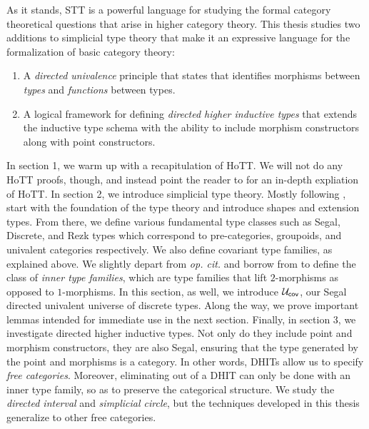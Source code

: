 \documentclass[main.tex]{subfiles}
\begin{document}
As it stands, STT is a powerful language for studying the formal category theoretical questions that arise in higher category theory. This thesis studies two additions to simplicial type theory that make it an expressive language for the formalization of basic category theory:
\begin{enumerate}
	\item A \textit{directed univalence} principle that states that identifies morphisms between \textit{types} and \textit{functions} between types.
	\item A logical framework for defining \textit{directed higher inductive types} that extends the inductive type schema with the ability to include morphism constructors along with point constructors.
\end{enumerate}
In section 1, we warm up with a recapitulation of HoTT. We will not do any HoTT proofs, though, and instead point the reader to \cite{program_homotopy_2013} for an in-depth expliation of HoTT. In section 2, we introduce simplicial type theory. Mostly following \cite{riehl_type_2017}, start with the foundation of the type theory and introduce shapes and extension types. From there, we define various fundamental type classes such as Segal, Discrete, and Rezk types which correspond to pre-categories, groupoids, and univalent categories respectively. We also define covariant type families, as explained above. We slightly depart from \textit{op. cit.} and borrow from \cite{buchholtz_synthetic_2022} to define the class of \textit{inner type families}, which are type families that lift $2$-morphisms as opposed to $1$-morphisms. In this section, as well, we introduce $\mathcal{U}_\mathsf{cov}$, our Segal directed univalent universe of discrete types. Along the way, we prove important lemmas intended for immediate use in the next section. Finally, in section 3, we investigate directed higher inductive types. Not only do they include point and morphism constructors, they are also Segal, ensuring that the type generated by the point and morphisms is a category. In other words, DHITs allow us to specify \textit{free categories}. Moreover, eliminating out of a DHIT can only be done with an inner type family, so as to preserve the categorical structure. We study the \textit{directed interval} and \textit{simplicial circle}, but the techniques developed in this thesis generalize to other free categories.
\end{document}
